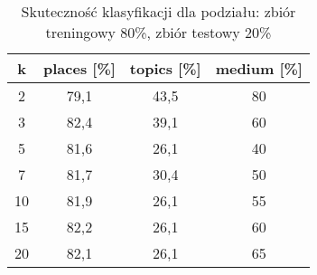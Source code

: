 \documentclass{classrep}
\begin{document}
\begin{table}[H]
	\centering
	\begin{tabular}{c c c c} 
		\hline
		\textbf{k} & \textbf{places [\%]} & \textbf{topics [\%]} &  \textbf{medium [\%]} \\ [0.5ex] 
		\hline
		\hline 
2 & 79,1 & 43,5 & 80 \\ 
3 & 82,4 & 39,1 & 60 \\ 
5 & 81,6 & 26,1 & 40 \\ 
7 & 81,7 & 30,4 & 50 \\ 
10 & 81,9 & 26,1 & 55 \\ 
15 & 82,2 & 26,1 & 60 \\ 
20 & 82,1 & 26,1 & 65 \\ 
		\hline
	\end{tabular}
	\caption{Skuteczność klasyfikacji dla podziału: zbiór treningowy 80\%, zbiór testowy 20\%}
\end{table}
\end{document}
